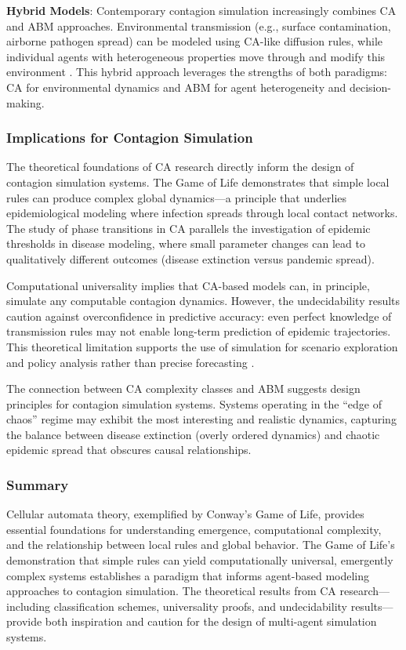 \textbf{Hybrid Models}: Contemporary contagion simulation increasingly combines CA and ABM approaches. Environmental transmission (e.g., surface contamination, airborne pathogen spread) can be modeled using CA-like diffusion rules, while individual agents with heterogeneous properties move through and modify this environment \cite{perez2009agent,hoertel2020stochastic}. This hybrid approach leverages the strengths of both paradigms: CA for environmental dynamics and ABM for agent heterogeneity and decision-making.

\subsubsection{Implications for Contagion Simulation}

The theoretical foundations of CA research directly inform the design of contagion simulation systems. The Game of Life demonstrates that simple local rules can produce complex global dynamics---a principle that underlies epidemiological modeling where infection spreads through local contact networks. The study of phase transitions in CA \cite{langton1990computation} parallels the investigation of epidemic thresholds in disease modeling, where small parameter changes can lead to qualitatively different outcomes (disease extinction versus pandemic spread).

Computational universality implies that CA-based models can, in principle, simulate any computable contagion dynamics. However, the undecidability results caution against overconfidence in predictive accuracy: even perfect knowledge of transmission rules may not enable long-term prediction of epidemic trajectories. This theoretical limitation supports the use of simulation for scenario exploration and policy analysis rather than precise forecasting \cite{saltelli2020five}.

The connection between CA complexity classes and ABM suggests design principles for contagion simulation systems. Systems operating in the ``edge of chaos'' regime may exhibit the most interesting and realistic dynamics, capturing the balance between disease extinction (overly ordered dynamics) and chaotic epidemic spread that obscures causal relationships.

\subsubsection{Summary}

Cellular automata theory, exemplified by Conway's Game of Life, provides essential foundations for understanding emergence, computational complexity, and the relationship between local rules and global behavior. The Game of Life's demonstration that simple rules can yield computationally universal, emergently complex systems establishes a paradigm that informs agent-based modeling approaches to contagion simulation. The theoretical results from CA research---including classification schemes, universality proofs, and undecidability results---provide both inspiration and caution for the design of multi-agent simulation systems.
